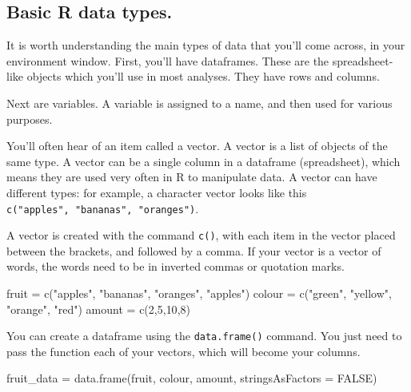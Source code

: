 \documentclass[
]{book}
\newenvironment{Shaded}{\begin{snugshade}}{\end{snugshade}}
\newcommand{\AttributeTok}[1]{\textcolor[rgb]{0.77,0.63,0.00}{#1}}
\newcommand{\ConstantTok}[1]{\textcolor[rgb]{0.00,0.00,0.00}{#1}}
\newcommand{\DecValTok}[1]{\textcolor[rgb]{0.00,0.00,0.81}{#1}}
\newcommand{\FunctionTok}[1]{\textcolor[rgb]{0.00,0.00,0.00}{#1}}
\newcommand{\NormalTok}[1]{#1}
\newcommand{\OtherTok}[1]{\textcolor[rgb]{0.56,0.35,0.01}{#1}}
\newcommand{\StringTok}[1]{\textcolor[rgb]{0.31,0.60,0.02}{#1}}
\begin{document}
\hypertarget{basic-r-data-types.}{%
\subsection{Basic R data types.}\label{basic-r-data-types.}}

It is worth understanding the main types of data that you'll come across, in your environment window. First, you'll have dataframes. These are the spreadsheet-like objects which you'll use in most analyses. They have rows and columns.

Next are variables. A variable is assigned to a name, and then used for various purposes.

You'll often hear of an item called a vector. A vector is a list of objects of the same type. A vector can be a single column in a dataframe (spreadsheet), which means they are used very often in R to manipulate data. A vector can have different types: for example, a character vector looks like this \texttt{c("apples",\ "bananas",\ "oranges")}.

A vector is created with the command \texttt{c()}, with each item in the vector placed between the brackets, and followed by a comma. If your vector is a vector of words, the words need to be in inverted commas or quotation marks.

\begin{Shaded}
\begin{Highlighting}[]
\NormalTok{fruit }\OtherTok{=} \FunctionTok{c}\NormalTok{(}\StringTok{"apples"}\NormalTok{, }\StringTok{"bananas"}\NormalTok{, }\StringTok{"oranges"}\NormalTok{, }\StringTok{"apples"}\NormalTok{)}
\NormalTok{colour }\OtherTok{=} \FunctionTok{c}\NormalTok{(}\StringTok{"green"}\NormalTok{, }\StringTok{"yellow"}\NormalTok{, }\StringTok{"orange"}\NormalTok{, }\StringTok{"red"}\NormalTok{)}
\NormalTok{amount }\OtherTok{=} \FunctionTok{c}\NormalTok{(}\DecValTok{2}\NormalTok{,}\DecValTok{5}\NormalTok{,}\DecValTok{10}\NormalTok{,}\DecValTok{8}\NormalTok{)}
\end{Highlighting}
\end{Shaded}

You can create a dataframe using the \texttt{data.frame()} command. You just need to pass the function each of your vectors, which will become your columns.

\begin{Shaded}
\begin{Highlighting}[]
\NormalTok{fruit\_data }\OtherTok{=} \FunctionTok{data.frame}\NormalTok{(fruit, colour, amount, }\AttributeTok{stringsAsFactors =} \ConstantTok{FALSE}\NormalTok{)}
\end{Highlighting}
\end{Shaded}
\end{document}
